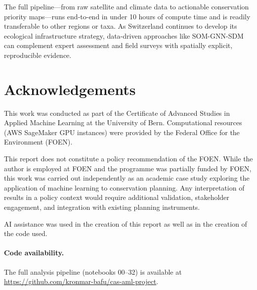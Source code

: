 The full pipeline---from raw satellite and climate data to
actionable conservation priority maps---runs end-to-end in
under 10 hours of compute time and is readily transferable to
other regions or taxa. As Switzerland continues to develop its
ecological infrastructure strategy, data-driven approaches like SOM-GNN-SDM 
can complement expert assessment and field surveys with spatially explicit, 
reproducible evidence.

\section*{Acknowledgements}

This work was conducted as part of the Certificate of Advanced
Studies in Applied Machine Learning at the University of Bern. 
Computational resources (AWS SageMaker GPU
instances) were provided by the Federal Office for the
Environment (FOEN).

This report does not constitute a policy recommendation of the
FOEN. While the author is employed at FOEN and the programme
was partially funded by FOEN, this work was carried out
independently as an academic case study exploring the
application of machine learning to conservation planning. Any
interpretation of results in a policy context would require
additional validation, stakeholder engagement, and integration
with existing planning instruments.

AI assistance was used in the creation of this report as well
as in the creation of the code used.

\paragraph{Code availability.}
The full analysis pipeline (notebooks 00--32) is available at
\url{https://github.com/kronmar-bafu/cas-aml-project}.
